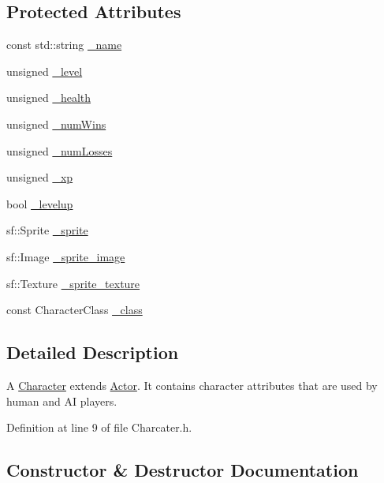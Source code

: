 \subsection*{Protected Attributes}
\begin{DoxyCompactItemize}
\item 
const std\+::string \hyperlink{class_character_aa86be1de1ef615913a552b2134fbb966}{\+\_\+name}
\item 
unsigned \hyperlink{class_character_ab76c68c70f6b8a7dd0d70291cfaeacaf}{\+\_\+level}
\item 
unsigned \hyperlink{class_character_a143e6724430834bf37d93efe4c8d4f98}{\+\_\+health}
\item 
unsigned \hyperlink{class_character_a68d70b5ab4f09cd2a74524fc3d162d3d}{\+\_\+num\+Wins}
\item 
unsigned \hyperlink{class_character_a0f2af69ac7a82ebff650b1a430bb4331}{\+\_\+num\+Losses}
\item 
unsigned \hyperlink{class_character_a1155ad0a6f019df868ce25fb18767c3d}{\+\_\+xp}
\item 
bool \hyperlink{class_character_a7d661e1d0a7631b0c5a2a06ef0165090}{\+\_\+levelup}
\item 
sf\+::\+Sprite \hyperlink{class_character_ab3b89d967b817bc3e199ed70f6b6277a}{\+\_\+sprite}
\item 
sf\+::\+Image \hyperlink{class_character_a1a8bdd55f5f5ec76eabc83c28f0207e4}{\+\_\+sprite\+\_\+image}
\item 
sf\+::\+Texture \hyperlink{class_character_aced7e12300ddeaee16c95850e028b10f}{\+\_\+sprite\+\_\+texture}
\item 
const Character\+Class \hyperlink{class_character_a1027f1708720c0f9bbf0da8c4ae10d97}{\+\_\+class}
\end{DoxyCompactItemize}


\subsection{Detailed Description}
A \hyperlink{class_character}{Character} extends \hyperlink{class_actor}{Actor}. It contains character attributes that are used by human and A\+I players. 

Definition at line 9 of file Charcater.\+h.



\subsection{Constructor \& Destructor Documentation}
\hypertarget{class_character_a4c236e411ce0bf61200c4d88e36debc5}{}

